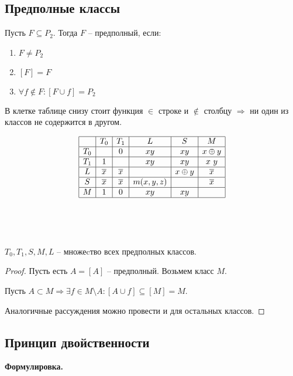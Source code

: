\subsection{Предполные классы}

\begin{definition}
	Пусть $F \subseteq P_2$. Тогда $F$ -- предполный, если: 
	\begin{enumerate}
		\item $F \ne P_2$
		\item $[F] = F$
		\item $\forall f \notin F: [F \cup {f}] = P_2$
	\end{enumerate}
\end{definition}

В клетке таблице снизу стоит функция $\in$ строке и $\not \in $ столбцу $\Rightarrow$ ни один из классов не содержится в другом.

$$\begin{array}{|c|c|c|c|c|c|}
\hline
 & T_0 & T_1 & L & S & M  \\
\hline
T_0 &  & 0 & xy & xy & x \oplus y \\
\hline
T_1 & 1 & &  xy & xy &  x ~ y \\
\hline
L & \overline{x} & \overline{x} &  & x \oplus y & \overline{x}\\
\hline
S & \overline{x} & \overline{x} & m(x, y, z) &  & \overline{x} \\
\hline
M & 1 & 0 & xy & xy &  \\
\hline
\end{array}$$
\\
\\\\

\begin{theorem}
	$T_0, T_1, S, M, L$ -- множеcтво всех предполных классов.
\end{theorem}

\begin{proof}
	Пусть есть $A = [A]$ -- предполный. Возьмем класс $M$.

	Пусть $A \subset M \Rightarrow \exists f \in M \setminus A : [A \cup {f}] \subseteq [M] = M$.

	Аналогичные рассуждения можно провести и для остальных классов.
\end{proof}

\subsection{Принцип двойственности}
{\bf Формулировка.}

